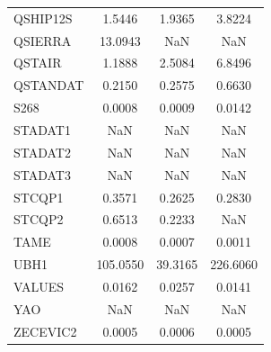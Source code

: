 \begin{longtable}{lccc}
QSHIP12S &        1.5446 &        1.9365 &        3.8224 \\
QSIERRA  &       13.0943 &           NaN &           NaN \\
QSTAIR   &        1.1888 &        2.5084 &        6.8496 \\
QSTANDAT &        0.2150 &        0.2575 &        0.6630 \\
S268     &        0.0008 &        0.0009 &        0.0142 \\
STADAT1  &           NaN &           NaN &           NaN \\
STADAT2  &           NaN &           NaN &           NaN \\
STADAT3  &           NaN &           NaN &           NaN \\
STCQP1   &        0.3571 &        0.2625 &        0.2830 \\
STCQP2   &        0.6513 &        0.2233 &           NaN \\
TAME     &        0.0008 &        0.0007 &        0.0011 \\
UBH1     &      105.0550 &       39.3165 &      226.6060 \\
VALUES   &        0.0162 &        0.0257 &        0.0141 \\
YAO      &           NaN &           NaN &           NaN \\
ZECEVIC2 &        0.0005 &        0.0006 &        0.0005 \\
\end{longtable}
